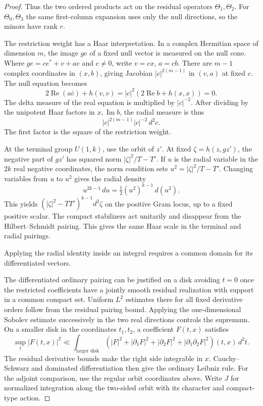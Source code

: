 \begin{proof}
Thus the two ordered products act on the residual operators
\(\Theta_1,\Theta_2\). For \(\Theta_0,\Theta_3\) the same
first-column expansion uses only the null directions, so the
minors have rank \(r\).


The restriction weight has a Haar interpretation.
In a complex Hermitian space of dimension \(m\), the
image \(ge\) of a fixed null vector is measured on the
null cone. Where \(ge=c e^*+v+a e\) and \(c\ne0\),
write \(v=c x\), \(a=c b\).
There are \(m-1\) complex coordinates in \((x,b)\), giving
Jacobian \(|c|^{2(m-1)}\) in \((v,a)\) at fixed \(c\).
The null equation becomes
\[
 2\operatorname{Re}(a\bar c)+h(v,v)
              =|c|^2(2\operatorname{Re}b+h(x,x))=0 .
\]
The delta measure of the real equation is multiplied by
\(|c|^{-2}\). After dividing by the unipotent Haar factors
in \(x,\operatorname{Im}b\), the radial measure is thus
\[
    |c|^{2(m-1)}|c|^{-2}\,d^2c .
\]
The first factor is the square of the restriction weight.

At the terminal group \(U(1,k)\), use the orbit of
\(z'\). At fixed \(\zeta=h(z,gz')\), the negative part
of \(gz'\) has squared norm \(|\zeta|^2/T-T'\).
If \(u\) is the radial variable in the \(2k\) real negative
coordinates, the norm condition sets
\(u^2=|\zeta|^2/T-T'\). Changing variables from \(u\) to
\(u^2\) gives the radial density
\[
        u^{2k-1}\,du=\tfrac12 (u^2)^{k-1}\,d(u^2).
\]
This yields \((|\zeta|^2-TT')^{k-1}d^2\zeta\) on the
positive Gram locus, up to a fixed positive scalar. The compact
stabilizers act unitarily and disappear from the
Hilbert--Schmidt pairing. This gives the same Haar
scale in the terminal and radial pairings.


Applying the radial identity inside an integral requires a common domain for its differentiated vectors.


The differentiated ordinary pairing can be justified
on a disk avoiding \(t=0\) once the restricted coefficients
have a jointly smooth residual realization with support in
a common compact set. Uniform \(L^2\) estimates there for
all fixed derivative orders follow from the residual
pairing bound. Applying the one-dimensional Sobolev estimate successively in the two real directions controls the supremum. On a smaller disk in the coordinates \(t_1,t_2\), a coefficient \(F(t,x)\) satisfies
\begin{equation}\label{eq:word-slice-sobolev}
 \sup_t |F(t,x)|^2
 \ll\int_{\text{larger disk}}
 \left(|F|^2+|\partial_1F|^2+|\partial_2F|^2+
             |\partial_1\partial_2F|^2\right)(t,x)\,d^2t .
\end{equation}
The residual derivative bounds make the right side integrable
in \(x\). Cauchy--Schwarz and dominated
differentiation then give the ordinary Leibniz rule.
For the adjoint comparison, use the regular orbit coordinates above. Write \(J\) for normalized integration along the two-sided orbit with its character and compact-type action.


\end{proof}
